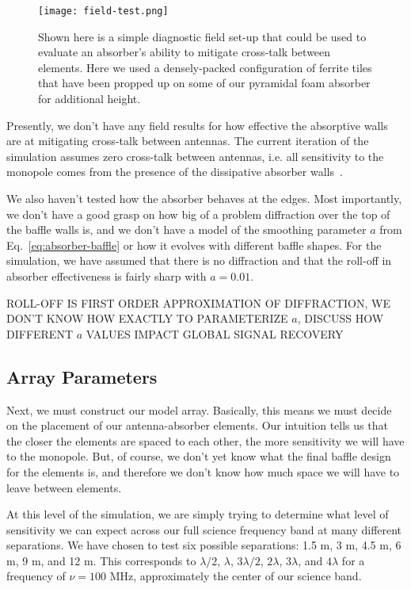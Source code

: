 \begin{figure}
    \begin{center}
    \texttt{[image: field-test.png]}
    \end{center}
    \caption{
        Shown here is a simple diagnostic field set-up that could be used to 
        evaluate an absorber's ability to mitigate cross-talk between elements.  
        Here we used a densely-packed configuration of ferrite tiles that have 
        been propped up on some of our pyramidal foam absorber for additional 
        height.
    }
    \label{fig:field-test}
\end{figure}

Presently, we don't have any field results for how effective the absorptive 
walls are at mitigating cross-talk between antennas. The current iteration of 
the simulation assumes zero cross-talk between antennas, i.e. all sensitivity 
to the monopole comes from the presence of the dissipative absorber 
walls~\citep{venumadhav2016}.

We also haven't tested how the absorber behaves at the edges. Most importantly, 
we don't have a good grasp on how big of a problem diffraction over the top of 
the baffle walls is, and we don't have a model of the smoothing parameter $a$ 
from Eq.~\eqref{eq:absorber-baffle} or how it evolves with different baffle 
shapes. For the simulation, we have assumed that there is no diffraction and 
that the roll-off in absorber effectiveness is fairly sharp with $a = 0.01$.

ROLL-OFF IS FIRST ORDER APPROXIMATION OF DIFFRACTION, WE DON'T KNOW HOW EXACTLY 
TO PARAMETERIZE $a$, DISCUSS HOW DIFFERENT $a$ VALUES IMPACT GLOBAL SIGNAL 
RECOVERY

\subsection{Array Parameters}

Next, we must construct our model array. Basically, this means we must decide 
on the placement of our antenna-absorber elements. Our intuition tells us that 
the closer the elements are spaced to each other, the more sensitivity we will 
have to the monopole. But, of course, we don't yet know what the final baffle 
design for the elements is, and therefore we don't know how much space we will 
have to leave between elements.

At this level of the simulation, we are simply trying to determine what level 
of sensitivity we can expect across our full science frequency band at many 
different separations. We have chosen to test six possible separations: 1.5 m, 
3 m, 4.5 m, 6 m, 9 m, and 12 m. This corresponds to $\lambda/2$, $\lambda$, 
  $3\lambda/2$, $2\lambda$, $3\lambda$, and $4\lambda$ for a frequency of $\nu 
  = 100$ MHz, approximately the center of our science band.

